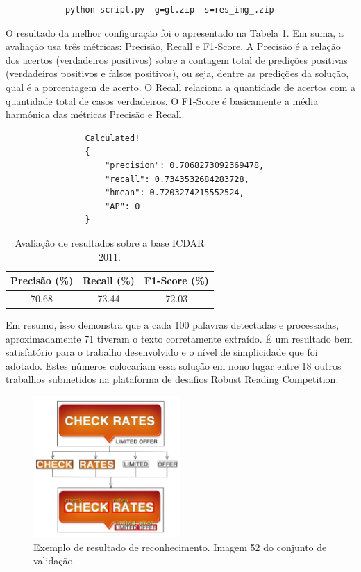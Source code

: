 \begin{verbatim}
            python script.py –g=gt.zip –s=res_img_.zip
\end{verbatim}

O resultado da melhor configuração foi o apresentado na Tabela \ref{tab:icdar11_results}. Em suma, a avaliação usa três métricas: Precisão, Recall e F1-Score. A Precisão é a relação dos acertos (verdadeiros positivos) sobre a contagem total de predições positivas (verdadeiros positivos e falsos positivos), ou seja, dentre as predições da solução, qual é a porcentagem de acerto. O Recall relaciona a quantidade de acertos com a quantidade total de casos verdadeiros. O F1-Score é basicamente a média harmônica das métricas Precisão e Recall.

\begin{verbatim}
                Calculated!
                {
                    "precision": 0.7068273092369478,
                    "recall": 0.7343532684283728,
                    "hmean": 0.7203274215552524, 
                    "AP": 0
                }
\end{verbatim}

\begin{table}[htb]
    \centering
    \caption{Avaliação de resultados sobre a base ICDAR 2011.}
    \begin{tabular}{|c|c|c|}
        \hline
        Precisão (\%) & Recall (\%) & F1-Score (\%) \\
        \hline
        70.68 & 73.44 & 72.03\\
        \hline
    \end{tabular}
    \label{tab:icdar11_results}
\end{table}

Em resumo, isso demonstra que a cada 100 palavras detectadas e processadas, aproximadamente 71 tiveram o texto corretamente extraído. É um resultado bem satisfatório para o trabalho desenvolvido e o nível de simplicidade que foi adotado. Estes números colocariam essa solução em nono lugar entre 18 outros trabalhos submetidos na plataforma de desafios Robust Reading Competition.

\begin{figure}
    \centering
    \includegraphics[width=0.5\textwidth]{figs/resultados-icdar11-01.png}
    \caption{Exemplo de resultado de reconhecimento. Imagem 52 do conjunto de validação.}
    \label{fig:results_icdar11_01}
\end{figure}

